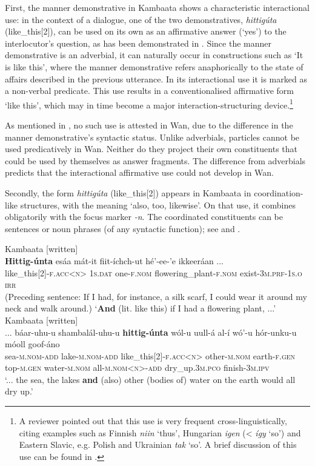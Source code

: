 \documentclass[output=paper,colorlinks,citecolor=brown]{langscibook}
\begin{document}
First, the manner demonstrative in Kambaata shows a characteristic interactional use: in the context of a dialogue, one of the two demonstratives, \textit{hittigúta} (like\_this[2]), can be used on its own as an affirmative answer (‘yes’) to the interlocutor’s question, as has been demonstrated in . Since the manner demonstrative is an adverbial, it can naturally occur in constructions such as ‘It is like this’, where the manner demonstrative refers anaphorically to the state of affairs described in the previous utterance. In its interactional use it is marked as a non-verbal predicate. This use results in a conventionalised affirmative form ‘like this’, which may in time become a major interaction-structuring device.\footnote{A reviewer pointed out that this use is very frequent cross-linguistically, citing examples such as Finnish \textit{niin} ‘thus’, Hungarian \textit{igen} (< \textit{így} ‘so’) and Eastern Slavic, e.g. Polish and Ukrainian \textit{tak} ‘so’. A brief discussion of this use can be found in \citet{König2015}.}

As mentioned in , no such use is attested in Wan, due to the difference in the manner demonstrative’s syntactic status. Unlike adverbials, particles cannot be used predicatively in Wan. Neither do they project their own constituents that could be used by themselves as answer fragments. The difference from adverbials predicts that the interactional affirmative use could not develop in Wan.

Secondly, the form \textit{hittigúta} (like\_this[2]) appears in Kambaata in coordination-like structures, with the meaning ‘also, too, likewise’. On that use, it combines obligatorily with the focus marker \textit{{}-n}. The coordinated constituents can be sentences or noun phrases (of any syntactic function); see  and .

\ea\label{ex:nikitina:15}
\ea\label{ex:nikitina:15a} {Kambaata [written]}\\
\gll \textbf{Hittig-únta} esáa mát-it fiit-íchch-ut hé’-ee-’e ikkeeráan ...\\
     like\_this[2]-\textsc{f.acc<n>} \textsc{1s.dat} one-\textsc{f.nom} flowering\_plant-\textsc{f.nom} exist-\textsc{3m.prf}{}-1\textsc{s.o} \textsc{irr}\\
\glt (Preceding sentence: If I had, for instance, a silk scarf, I could wear it around my neck and walk around.) ‘\textbf{And} (lit. like this) if I had a flowering plant, ...’
\ex\label{ex:nikitina:15b} {Kambaata [written]}\\
\gll ... báar-uhu-u shambalál-uhu-u \textbf{hittig-únta} wól-u uull-á al-í wó’-u hór-unku-u móoll goof-áno\\
     {} sea-\textsc{m.nom-add} lake-\textsc{m.nom}{}-\textsc{add} like\_this[2]\textsc{{}-f.acc<n>} other-\textsc{m.nom} earth-\textsc{f.gen} top-\textsc{m.gen} water-\textsc{m.nom} all-\textsc{m.nom}<\textsc{n}>-\textsc{add} dry\_up.\textsc{3m.pco} finish-\textsc{3m.ipv}\\
\glt ‘... the sea, the lakes \textbf{and} (also) other (bodies of) water on the earth would all dry up.’
\z
\z
\end{document}
